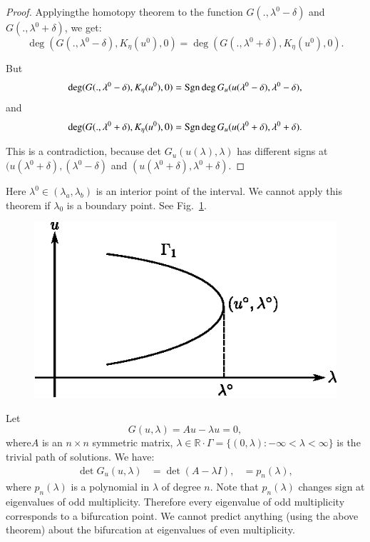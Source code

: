 \begin{proof}
Applying\pageoriginale the homotopy theorem to the function $G (., \lambda^0 -
\delta)$ and $G (., \lambda^0 + \delta)$, we get: 
$$
\deg (G (., \lambda^0 - \delta), K_{\eta}(u^0),0) = \deg (G (.,
\lambda^0 + \delta), K_{\eta}(u^0),0). 
$$

But 
$$
\deg (G (., \lambda^0 - \delta), K_{\eta}(u^0),0) = {\rm Sgn} \deg G_u(u ( 
\lambda^0 - \delta), \lambda^0 - \delta),  
$$ 
and 
$$
\deg (G (., \lambda^0 + \delta), K_{\eta}(u^0),0) = {\rm Sgn} \deg G_u (
u(\lambda^0 + \delta), \lambda^0 + \delta). 
$$

This is a contradiction, because det $G_u(u(\lambda),\lambda)$ has
different signs at $(u ( \lambda^0 + \delta), ( \lambda^0 - \delta)$
and $(u ( \lambda^0 + \delta), \lambda^0 + \delta)$. 
\end{proof}

\begin{note*}
 Here $\lambda^0 \in(\lambda_a,\lambda_b)$ is an interior
 point of the interval. We cannot apply this theorem if $\lambda_0$ is
 a boundary point. See Fig.~\ref{chap3-fig3.4}. 

\begin{figure}[H]
\centering
\includegraphics{vol79-fig/fig79-22.eps}
\smallskip
\caption{}
\label{chap3-fig3.4}
\end{figure}
\end{note*}

\begin{example*}
Let 
$$
G(u,\lambda) = Au - \lambda u = 0, 
$$
where\pageoriginale $A$ is an $n \times n$ symmetric matrix, $ \lambda \in
\mathbb{R} \cdot \Gamma = \{ (0, \lambda) : - \infty < \lambda < \infty \}$
is the trivial path of solutions. We have: 
\begin{align*}
\det G_u(u,\lambda ) & = \det (A - \lambda I),
& = p_n (\lambda ),
\end{align*}
where $ p_n (\lambda)$ is a polynomial in $\lambda$ of degree
$n$. Note that $ p_n (\lambda)$ changes sign at eigenvalues of odd
multiplicity. Therefore every eigenvalue of odd multiplicity
corresponds to a bifurcation point. We cannot predict anything (using
the above theorem) about the bifurcation at eigenvalues of even
multiplicity.
\end{example*}

